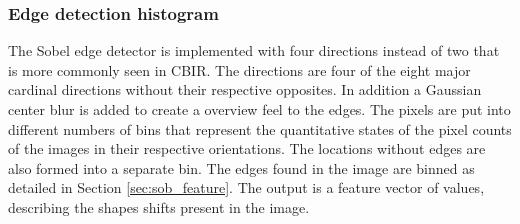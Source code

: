 \subsubsection{Edge detection histogram}
\label{sec:meth:featextr:edge}
The Sobel edge detector is implemented with four directions instead of two that is more commonly seen in CBIR. The directions are four of the eight major cardinal directions without their respective opposites. In addition a Gaussian center blur is added to create a overview feel to the edges. The pixels are put into different numbers of bins that represent the quantitative states of the pixel counts of the images in their respective orientations. The locations without edges are also formed into a separate bin. The edges found in the image are binned as detailed in Section \ref{sec:sob_feature}. The output is a feature vector of values, describing the shapes shifts present in the image. 




